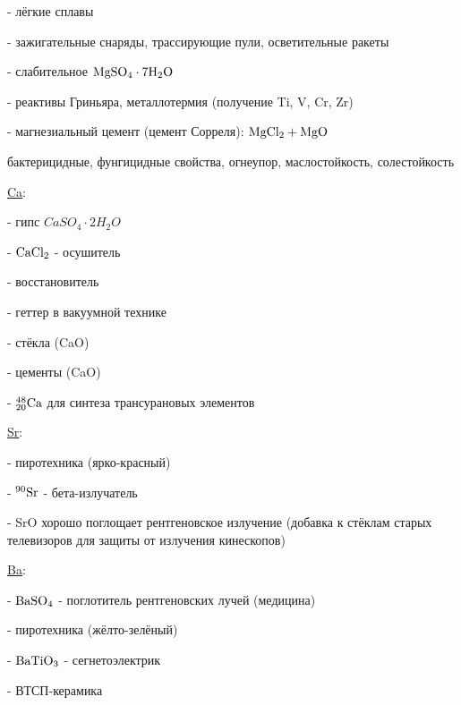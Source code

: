\par - лёгкие сплавы
\par - зажигательные снаряды, трассирующие пули, осветительные ракеты
\par - слабительное $\rm MgSO_4\cdot 7H_2O$
\par - реактивы Гриньяра, металлотермия (получение Ti, V, Cr, Zr)
\par - магнезиальный цемент (цемент Сорреля): $\rm MgCl_2 + MgO$
\par бактерицидные, фунгицидные свойства, огнеупор, маслостойкость, солестойкость
\par \underline{Ca}:
\par - гипс $CaSO_4\cdot 2 H_2O$
\par - $\rm CaCl_2$ - осушитель
\par - восстановитель
\par - геттер в вакуумной технике
\par - стёкла (CaO)
\par - цементы (CaO)
\par - $\rm {}_{20}^{48}Ca$ для синтеза трансурановых элементов
\par \underline{Sr}: 
\par - пиротехника (ярко-красный)
\par - $\rm {}^{90}Sr$ - бета-излучатель
\par - SrO хорошо поглощает рентгеновское излучение (добавка к стёклам старых телевизоров для защиты от излучения кинескопов)
\par \underline{Ba}:
\par - $\rm BaSO_4 $ - поглотитель рентгеновских лучей (медицина)
\par - пиротехника (жёлто-зелёный)
\par - $\rm BaTiO_3$ - сегнетоэлектрик
\par - ВТСП-керамика
